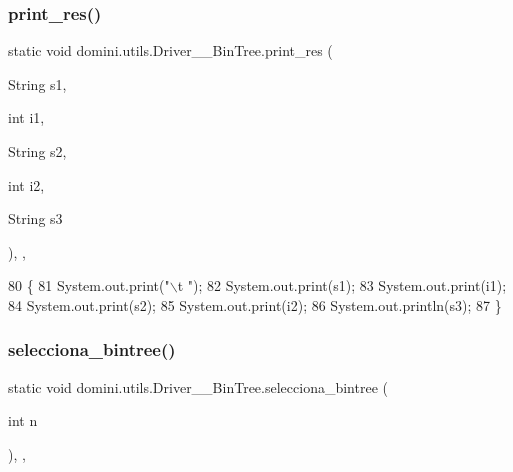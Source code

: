 \subsubsection{\texorpdfstring{print\+\_\+res()}{print\_res()}\hspace{0.1cm}{\footnotesize\ttfamily [2/2]}}
{\footnotesize\ttfamily static void domini.\+utils.\+Driver\+\_\+\+\_\+\+Bin\+Tree.\+print\+\_\+res (\begin{DoxyParamCaption}\item[{String}]{s1,  }\item[{int}]{i1,  }\item[{String}]{s2,  }\item[{int}]{i2,  }\item[{String}]{s3 }\end{DoxyParamCaption})\hspace{0.3cm}{\ttfamily [inline]}, {\ttfamily [static]}, {\ttfamily [private]}}


\begin{DoxyCode}
80                                                                                    \{
81         System.out.print(\textcolor{stringliteral}{"\(\backslash\)t "});
82         System.out.print(s1);
83         System.out.print(i1);
84         System.out.print(s2);
85         System.out.print(i2);
86         System.out.println(s3);
87     \}
\end{DoxyCode}
\mbox{\label{classdomini_1_1utils_1_1Driver____BinTree_a0d90bf2cb928174547e712140b5a4fe5}} 
\subsubsection{\texorpdfstring{selecciona\+\_\+bintree()}{selecciona\_bintree()}}
{\footnotesize\ttfamily static void domini.\+utils.\+Driver\+\_\+\+\_\+\+Bin\+Tree.\+selecciona\+\_\+bintree (\begin{DoxyParamCaption}\item[{int}]{n }\end{DoxyParamCaption})\hspace{0.3cm}{\ttfamily [inline]}, {\ttfamily [static]}, {\ttfamily [private]}}


